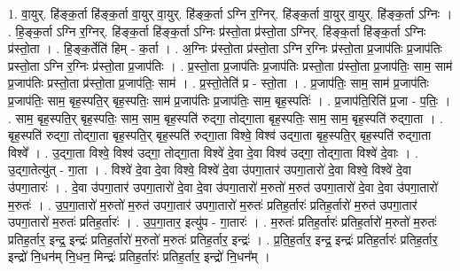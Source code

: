 \documentclass[17pt]{extarticle}
\begin{document}
1. वा॒युर्. हि॑ङ्क॒र्ता हि॑ङ्क॒र्ता वा॒युर् वा॒युर्. हि॑ङ्क॒र्ता ऽग्नि र॒ग्निर्. हि॑ङ्क॒र्ता वा॒युर् वा॒युर्. हि॑ङ्क॒र्ता ऽग्निः । . हि॒ङ्क॒र्ता ऽग्नि र॒ग्निर्. हि॑ङ्क॒र्ता हि॑ङ्क॒र्ता ऽग्निः प्र॑स्तो॒ता प्र॑स्तो॒ता ऽग्निर्. हि॑ङ्क॒र्ता हि॑ङ्क॒र्ता ऽग्निः प्र॑स्तो॒ता । . हि॒ङ्क॒र्तेति॑ हिम् - क॒र्ता । . अ॒ग्निः प्र॑स्तो॒ता प्र॑स्तो॒ता ऽग्नि र॒ग्निः प्र॑स्तो॒ता प्र॒जाप॑तिः प्र॒जाप॑तिः प्रस्तो॒ता ऽग्नि र॒ग्निः प्र॑स्तो॒ता प्र॒जाप॑तिः । . प्र॒स्तो॒ता प्र॒जाप॑तिः प्र॒जाप॑तिः प्रस्तो॒ता प्र॑स्तो॒ता प्र॒जाप॑तिः॒ साम॒ साम॑ प्र॒जाप॑तिः प्रस्तो॒ता प्र॑स्तो॒ता प्र॒जाप॑तिः॒ साम॑ । . प्र॒स्तो॒तेति॑ प्र - स्तो॒ता । . प्र॒जाप॑तिः॒ साम॒ साम॑ प्र॒जाप॑तिः प्र॒जाप॑तिः॒ साम॒ बृह॒स्पति॒र् बृह॒स्पतिः॒ साम॑ प्र॒जाप॑तिः प्र॒जाप॑तिः॒ साम॒ बृह॒स्पतिः॑ । . प्र॒जाप॑ति॒रिति॑ प्र॒जा - प॒तिः॒ । . साम॒ बृह॒स्पति॒र् बृह॒स्पतिः॒ साम॒ साम॒ बृह॒स्पति॑ रुद्‍गा॒ तोद्‍गा॒ता बृह॒स्पतिः॒ साम॒ साम॒ बृह॒स्पति॑ रुद्‍गा॒ता । . बृह॒स्पति॑ रुद्‍गा॒ तोद्‍गा॒ता बृह॒स्पति॒र् बृह॒स्पति॑ रुद्‍गा॒ता विश्वे॒ विश्व॑ उद्‍गा॒ता बृह॒स्पति॒र् बृह॒स्पति॑ रुद्‍गा॒ता विश्वे᳚ । . उ॒द्‍गा॒ता विश्वे॒ विश्व॑ उद्‍गा॒ तोद्‍गा॒ता विश्वे॑ दे॒वा दे॒वा विश्व॑ उद्‍गा॒ तोद्‍गा॒ता विश्वे॑ दे॒वाः । . उ॒द्‍गा॒तेत्यु॑त् - गा॒ता । . विश्वे॑ दे॒वा दे॒वा विश्वे॒ विश्वे॑ दे॒वा उ॑पगा॒तार॑ उपगा॒तारो॑ दे॒वा विश्वे॒ विश्वे॑ दे॒वा उ॑पगा॒तारः॑ । . दे॒वा उ॑पगा॒तार॑ उपगा॒तारो॑ दे॒वा दे॒वा उ॑पगा॒तारो॑ म॒रुतो॑ म॒रुत॑ उपगा॒तारो॑ दे॒वा दे॒वा उ॑पगा॒तारो॑ म॒रुतः॑ । . उ॒प॒गा॒तारो॑ म॒रुतो॑ म॒रुत॑ उपगा॒तार॑ उपगा॒तारो॑ म॒रुतः॑ प्रतिह॒र्तारः॑ प्रतिह॒र्तारो॑ म॒रुत॑ उपगा॒तार॑ उपगा॒तारो॑ म॒रुतः॑ प्रतिह॒र्तारः॑ । . उ॒प॒गा॒तार॒ इत्यु॑प - गा॒तारः॑ । . म॒रुतः॑ प्रतिह॒र्तारः॑ प्रतिह॒र्तारो॑ म॒रुतो॑ म॒रुतः॑ प्रतिह॒र्तार॒ इन्द्र॒ इन्द्रः॑ प्रतिह॒र्तारो॑ म॒रुतो॑ म॒रुतः॑ प्रतिह॒र्तार॒ इन्द्रः॑ । . प्र॒ति॒ह॒र्तार॒ इन्द्र॒ इन्द्रः॑ प्रतिह॒र्तारः॑ प्रतिह॒र्तार॒ इन्द्रो॑ नि॒धन॑म् नि॒धन॒ मिन्द्रः॑ प्रतिह॒र्तारः॑ प्रतिह॒र्तार॒ इन्द्रो॑ नि॒धन᳚म् । \newline
\end{document}
